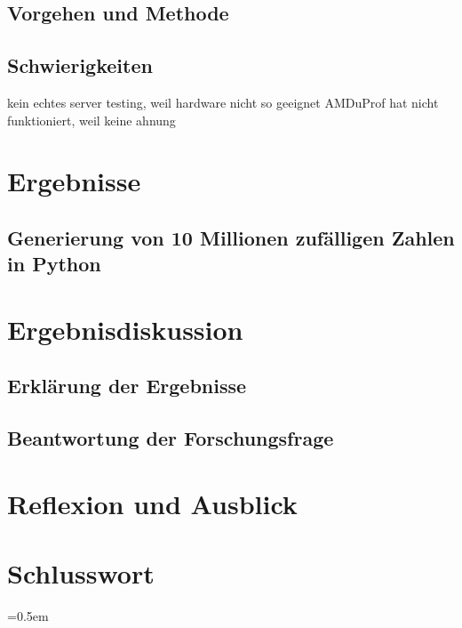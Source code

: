 \documentclass[11pt,a4paper]{article}
\begin{document}
\subsection{Vorgehen und Methode}

\subsection{Schwierigkeiten}

kein echtes server testing, weil hardware nicht so geeignet
AMDuProf hat nicht funktioniert, weil keine ahnung

\section{Ergebnisse}

\subsection{Generierung von 10 Millionen zufälligen Zahlen in Python}

\clearpage

\section{Ergebnisdiskussion}

\subsection{Erklärung der Ergebnisse}

\subsection{Beantwortung der Forschungsfrage}

\section{Reflexion und Ausblick}

\section{Schlusswort}

\clearpage

\begin{bchart}[min=0, max=30, scale=1.9]
    \smallskip
    \smallskip
    \smallskip
    \smallskip
    \smallskip
\end{bchart}

\vspace{0.5cm}

\emergencystretch=0.5em

\end{document}
